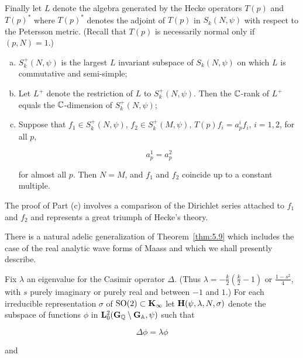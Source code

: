 Finally let $L$ denote the algebra generated by the Hecke operators $T(p)$ and $T(p)^*$ where $T(p)^*$ denotes the adjoint of $T(p)$ in $S_k(N, \psi)$ with respect to the Petersson metric. (Recall that $T(p)$ is necessarily normal only if $(p, N) = 1$.)

\begin{theorem}\label{thm:5.9}

\begin{enumerate}[(a)]

\item $S_k^+(N,\psi)$ is the largest $L$ invariant subspace of $S_k(N,\psi)$ on which $L$ is commutative and semi-simple;

\item Let $L^+$ denote the restriction of $L$ to $S_k^+(N,\psi)$. Then the $\mathbb{C}$-rank of $L^+$ equals the $\mathbb{C}$-dimension of $S_k^+(N,\psi)$;

\item Suppose that $f_1 \in S_k^+(N, \psi)$, $f_2 \in S_k^+(M, \psi)$, $T(p) f_i = a_p^i f_i$, $i = 1, 2$, for all $p$,

\[
a_p^1 = a_p^2
\]

for almost all $p$. Then $N = M$, and $f_1$ and $f_2$ coincide up to a constant multiple.

\end{enumerate}

\end{theorem}

The proof of Part (c) involves a comparison of the Dirichlet series attached to $f_1$ and $f_2$ and represents a great triumph of Hecke's theory.

There is a natural adelic generalization of Theorem~\ref{thm:5.9} which includes the case of the real analytic wave forms of Maass and which we shall presently describe.

Fix $\lambda$ an eigenvalue for the Casimir operator $\Delta$. (Thus $\lambda = -\frac{k}{2}\left(\frac{k}{2} - 1\right)$ or $\frac{1 - s^2}{4}$, with $s$ purely imaginary or purely real and between $-1$ and $1$.) For each irreducible representation $\sigma$ of $\operatorname{SO}(2) \subset \mathbf{K}_{\infty}$ let $\mathbf{H}(\psi, \lambda, N, \sigma)$ denote the subspace of functions $\phi$ in $\mathbf{L}_0^2(\mathbf{G}_{\mathbb{Q}} \setminus \mathbf{G}_{\mathbb{A}}, \psi)$ such that

\begin{equation}\label{eq:5.10}
\Delta\phi = \lambda\phi\tag{5.10}
\end{equation}

and

